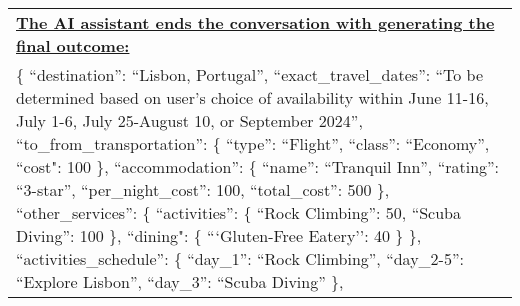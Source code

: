 \begin{table*}[!htbp]
    \centering
    \begin{tabular}{p{}}
    \toprule

\textbf{\underline{The AI assistant ends the conversation with generating the final outcome:}} \\
\{ \newline 
    ``destination'': ``Lisbon, Portugal'', \newline 
    ``exact\_travel\_dates'': ``To be determined based on user's choice of availability within June 11-16, July 1-6, July 25-August 10, or September 2024'', \newline 
    ``to\_from\_transportation'': \{ \newline 
        ``type'': ``Flight'', \newline 
        ``class'': ``Economy'', \newline 
        ``cost": 100 \newline 
    \}, \newline 
    ``accommodation'': \{ \newline 
        ``name'': ``Tranquil Inn'', \newline 
        ``rating'': ``3-star'', \newline 
        ``per\_night\_cost'': 100, \newline 
       ``total\_cost'': 500 \newline 
    \},\newline  
    ``other\_services'': \{ \newline  
       ``activities'': \{\newline  
            ``Rock Climbing'': 50,\newline 
            ``Scuba Diving'': 100 \newline 
        \}, \newline  
        ``dining": \{\newline 
            ```Gluten-Free Eatery'': 40 \newline 
        \} \newline 
    \}, \newline 
    ``activities\_schedule'': \{ \newline 
       ``day\_1'': ``Rock Climbing'', \newline 
        ``day\_2-5'': ``Explore Lisbon'', \newline 
        ``day\_3'': ``Scuba Diving'' \newline 
    \}, \newline 

\end{tabular}
\end{table*}
